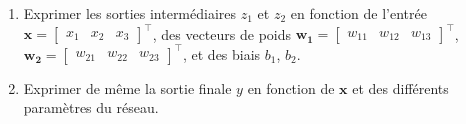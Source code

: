 	\begin{enumerate}
	\item Exprimer les sorties intermédiaires $z_1$ et $z_2$ en fonction de l'entrée $\mathbf{x} = \begin{bmatrix} x_1 & x_2 & x_3\end{bmatrix}^\top$, des vecteurs de poids $\mathbf{w_1} = \begin{bmatrix} w_{11} & w_{12} & w_{13} \end{bmatrix}^\top$, $\mathbf{w_2} = \begin{bmatrix} w_{21} & w_{22} & w_{23} \end{bmatrix}^\top$, et des biais $b_1$, $b_2$.
	\item  Exprimer de même la sortie finale $y$ en fonction de $\mathbf{x}$ et des différents paramètres du réseau.
	\end{enumerate}

